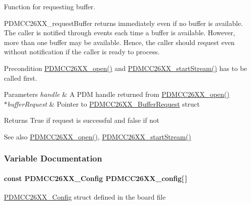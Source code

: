 Function for requesting buffer. 

P\+D\+M\+C\+C26\+X\+X\+\_\+request\+Buffer returns immediately even if no buffer is available. The caller is notified through events each time a buffer is available. However, more than one buffer may be available. Hence, the caller should request even without notification if the caller is ready to process.

\begin{DoxyPrecond}{Precondition}
\hyperlink{_p_d_m_c_c26_x_x_8h_a431d9b71e0d0eebd5ab85960f1c82ee0}{P\+D\+M\+C\+C26\+X\+X\+\_\+open()} and \hyperlink{_p_d_m_c_c26_x_x_8h_af5fafd7c475117bd3ed6783273c2220d}{P\+D\+M\+C\+C26\+X\+X\+\_\+start\+Stream()} has to be called first.
\end{DoxyPrecond}

\begin{DoxyParams}{Parameters}
{\em handle} & A P\+D\+M handle returned from \hyperlink{_p_d_m_c_c26_x_x_8h_a431d9b71e0d0eebd5ab85960f1c82ee0}{P\+D\+M\+C\+C26\+X\+X\+\_\+open()}\\
\hline
{\em $\ast$buffer\+Request} & Pointer to \hyperlink{struct_p_d_m_c_c26_x_x___buffer_request}{P\+D\+M\+C\+C26\+X\+X\+\_\+\+Buffer\+Request} struct\\
\hline
\end{DoxyParams}
\begin{DoxyReturn}{Returns}
True if request is successful and false if not
\end{DoxyReturn}
\begin{DoxySeeAlso}{See also}
\hyperlink{_p_d_m_c_c26_x_x_8h_a431d9b71e0d0eebd5ab85960f1c82ee0}{P\+D\+M\+C\+C26\+X\+X\+\_\+open()}, \hyperlink{_p_d_m_c_c26_x_x_8h_af5fafd7c475117bd3ed6783273c2220d}{P\+D\+M\+C\+C26\+X\+X\+\_\+start\+Stream()} 
\end{DoxySeeAlso}


\subsubsection{Variable Documentation}
\paragraph[{P\+D\+M\+C\+C26\+X\+X\+\_\+config}]{\setlength{\rightskip}{0pt plus 5cm}const {\bf P\+D\+M\+C\+C26\+X\+X\+\_\+\+Config} P\+D\+M\+C\+C26\+X\+X\+\_\+config\mbox{[}$\,$\mbox{]}}\label{_p_d_m_c_c26_x_x_8h_affba2052183dd56aa6315608a6ec2633}
\hyperlink{struct_p_d_m_c_c26_x_x___config}{P\+D\+M\+C\+C26\+X\+X\+\_\+\+Config} struct defined in the board file 